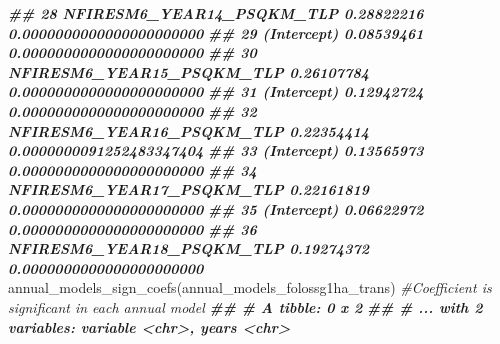\documentclass[10pt,landscape,a3paper]{article}
\newenvironment{Shaded}{\begin{snugshade}}{\end{snugshade}}
\newcommand{\CommentTok}[1]{\textcolor[rgb]{0.56,0.35,0.01}{\textit{#1}}}
\newcommand{\DocumentationTok}[1]{\textcolor[rgb]{0.56,0.35,0.01}{\textbf{\textit{#1}}}}
\newcommand{\FunctionTok}[1]{\textcolor[rgb]{0.00,0.00,0.00}{#1}}
\newcommand{\NormalTok}[1]{#1}
\begin{document}
\begin{Shaded}
\begin{Highlighting}[]
\DocumentationTok{\#\# 28 NFIRESM6\_YEAR14\_PSQKM\_TLP 0.28822216 0.0000000000000000000000}
\DocumentationTok{\#\# 29               (Intercept) 0.08539461 0.0000000000000000000000}
\DocumentationTok{\#\# 30 NFIRESM6\_YEAR15\_PSQKM\_TLP 0.26107784 0.0000000000000000000000}
\DocumentationTok{\#\# 31               (Intercept) 0.12942724 0.0000000000000000000000}
\DocumentationTok{\#\# 32 NFIRESM6\_YEAR16\_PSQKM\_TLP 0.22354414 0.0000000091252483347404}
\DocumentationTok{\#\# 33               (Intercept) 0.13565973 0.0000000000000000000000}
\DocumentationTok{\#\# 34 NFIRESM6\_YEAR17\_PSQKM\_TLP 0.22161819 0.0000000000000000000000}
\DocumentationTok{\#\# 35               (Intercept) 0.06622972 0.0000000000000000000000}
\DocumentationTok{\#\# 36 NFIRESM6\_YEAR18\_PSQKM\_TLP 0.19274372 0.0000000000000000000000}
\FunctionTok{annual\_models\_sign\_coefs}\NormalTok{(annual\_models\_folossg1ha\_trans)  }\CommentTok{\#Coefficient is significant in each annual model}
\DocumentationTok{\#\# \# A tibble: 0 x 2}
\DocumentationTok{\#\# \# ... with 2 variables: variable \textless{}chr\textgreater{}, years \textless{}chr\textgreater{}}


\end{Highlighting}
\end{Shaded}
\end{document}
